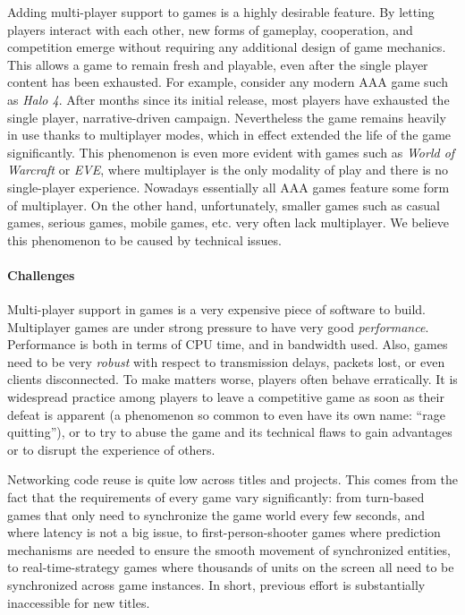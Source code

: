 Adding multi-player support to games is a highly desirable feature. By letting players interact with each other, new forms of gameplay, cooperation, and competition emerge without requiring any additional design of game mechanics. This allows a game to remain fresh and playable, even after the single player content has been exhausted. For example, consider any modern AAA game such as \textit{Halo 4}. After months since its initial release, most players have exhausted the single player, narrative-driven campaign. Nevertheless the game remains heavily in use thanks to multiplayer modes, which in effect extended the life of the game significantly. This phenomenon is even more evident with games such as \textit{World of Warcraft} or \textit{EVE}, where multiplayer is the only modality of play and there is no single-player experience. Nowadays essentially all AAA games feature some form of multiplayer. On the other hand, unfortunately, smaller games such as casual games, serious games, mobile games, etc. very often lack multiplayer. We believe this phenomenon to be caused by technical issues.

\paragraph{Challenges}
Multi-player support in games is a very expensive piece of software to build. Multiplayer games are under strong pressure to have very good \textit{performance}. Performance is both in terms of CPU time, and in bandwidth used. Also, games need to be very \textit{robust} with respect to transmission delays, packets lost, or even clients disconnected. To make matters worse, players often behave erratically. It is widespread practice among players to leave a competitive game as soon as their defeat is apparent (a phenomenon so common to even have its own name: ``rage quitting''), or to try to abuse the game and its technical flaws to gain advantages or to disrupt the experience of others.

Networking code reuse is quite low across titles and projects. This comes from the fact that the requirements of every game vary significantly: from turn-based games that only need to synchronize the game world every few seconds, and where latency is not a big issue, to first-person-shooter games where prediction mechanisms are needed to ensure the smooth movement of synchronized entities, to real-time-strategy games where thousands of units on the screen all need to be synchronized across game instances. In short, previous effort is substantially inaccessible for new titles.

